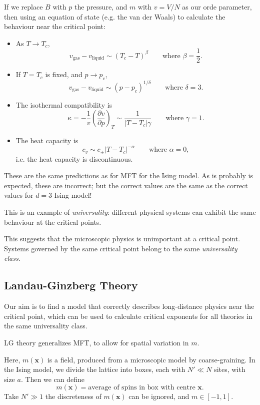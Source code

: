 \documentclass[12pt]{article}
\begin{document}
If we replace $B$ with $p$ the pressure, and $m$ with $v = V/N$ as our orde parameter, then using an equation of state (e.g. the van der Waals) to calculate the behaviour near the critical point:
\begin{itemize}
	\item As $T \to T_c$,
		\[
			v_{\mathrm{gas}} - v_{\mathrm{liquid}} \sim (T_c - T)^\beta \qquad \text{where } \beta = \frac{1}{2}.
		\]
	\item If $T = T_c$ is fixed, and $p \to p_c$,
		\[
			v_{\mathrm{gas}} - v_{\mathrm{liquid}} \sim (p - p_c)^{1/\delta} \qquad \text{where } \delta = 3.
		\]
	\item The isothermal compatibility is
		\[
			\kappa = - \frac{1}{v} \left( \frac{\partial v}{\partial p} \right)_T \sim \frac{1}{|T - T_c|\gamma} \qquad \text{where } \gamma = 1.
		\]
	\item The heat capacity is
		\[
			c_v \sim c_{\pm} |T - T_c|^{-\alpha} \qquad \text{where }\alpha = 0,
		\]
		i.e. the heat capacity is discontinuous.
\end{itemize}

These are the same predictions as for MFT for the Ising model. As is probably is expected, these are incorrect; but the correct values are the same as the correct values for $d = 3$ Ising model!

This is an example of \emph{universality}: different physical systems can exhibit the same behaviour at the critical points.

This suggests that the microscopic physics is unimportant at a critical point. Systems governed by the same critical point belong to the same \emph{universality class}.

\subsection{Landau-Ginzberg Theory}%
\label{sub:lgt}

Our aim is to find a model that correctly describes long-distance physics near the critical point, which can be used to calculate critical exponents for all theories in the same universality class.

LG theory generalizes MFT, to allow for spatial variation in $m$.

Here, $m(\mathbf{x})$ is a field, produced from a microscopic model by coarse-graining. In the Ising model, we divide the lattice into boxes, each with $N' \ll N$ sites, with size $a$. Then we can define
\[
	m(\mathbf{x}) = \text{average of spins in box with centre } \mathbf{x}.
\]
Take $N' \gg 1$ the discreteness of $m(\mathbf{x})$ can be ignored, and $m \in [-1, 1]$.
\end{document}
